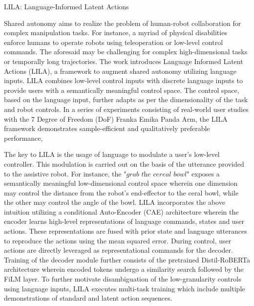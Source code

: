 \documentclass[12pt,letterpaper]{article}
\begin{document}
\begin{center}
  \large{LILA: Language-Informed Latent Actions}
\end{center}

Shared autonomy aims to realize the problem of human-robot collaboration for complex manipulation tasks. For instance, a myriad of physical disabilities enforce humans to operate robots using teleoperation or low-level control commands. The aforesaid may be challenging for complex high-dimensional tasks or temporally long trajectories. The work introduces Language Informed Latent Actions (LILA), a framework to augment shared autonomy utilizing language inputs. LILA combines low-level control inputs with discrete language inputs to provide users with a semantically meaningful control space. The control space, based on the language input, further adapts as per the dimensionality of the task and robot controls. In a series of experiments consisting of real-world user studies with the 7 Degree of Freedom (DoF) Franka Emika Panda Arm, the LILA framework demonstrates sample-efficient and qualitatively preferable performance,

The key to LILA is the usage of language to modulate a user's low-level controller. This modulation is carried out on the basis of the utterance provided to the assistive robot. For instance, the $\textit{"grab the cereal bowl"}$ exposes a semantically meaningful low-dimensional control space wherein one dimension may control the distance from the robot's end-effector to the ceral bowl, while the other may control the angle of the bowl. LILA incorporates the above intuition utilizing a conditional Auto-Encoder (CAE) architecture wherein the encoder learns high-level representations of language commands, states and user actions. These representations are fused with prior state and language utterances to reproduce the actions using the mean squared error. During control, user actions are directly leveraged as representational commands for the decoder. Training of the decoder module further consists of the pretrained Distil-RoBERTa architecture wherein encoded tokens undergo a similarity search followed by the FiLM layer. To further motivate disambiguation of the low-granularity controls using language inputs, LILA executes multi-task training which include multiple demonstrations of standard and latent action sequences. 
\end{document}
